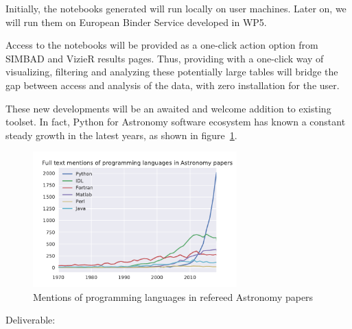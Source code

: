 \begin{task}[
  title=Astronomy application,
  id=astro,
  lead=CDS,
  PM=18,
  wphases={0-48},
  partners={CDS}
]
  Initially, the notebooks generated will run locally on user machines.
  Later on, we will run them on European Binder Service developed in WP5.

  Access to the notebooks will be provided as a one-click action option from
  SIMBAD and VizieR results pages.
  Thus, providing with a one-click way of visualizing, filtering and analyzing
these potentially large tables will bridge the gap between access and analysis
of the data, with zero installation for the user.

  These new developments will be an awaited and welcome addition to existing 
  toolset. In fact, Python for Astronomy software ecosystem has known a constant
    steady growth in the latest years, as shown in figure~\ref{fig:python-astro-citations}.

  \begin{figure}[ht]\centering
  \includegraphics[width=0.7\textwidth]{python-astro-citations}
  \caption{Mentions of programming languages in refereed Astronomy papers}\label{fig:python-astro-citations}
\end{figure}

  Deliverable: 

\end{task}

